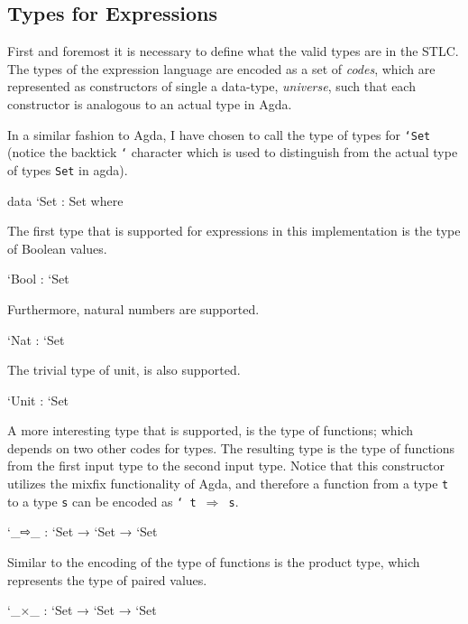 \documentclass{article}
\begin{document}
\subsection{Types for Expressions}
\label{sub:TypesforExpressions}

First and foremost it is necessary to define what the valid types are in the STLC.
The types of the expression language are encoded as a set of \textit{codes}, which are represented as constructors of single a data-type, \textit{universe},
such that each constructor is analogous to an actual type in Agda.

In a similar fashion to Agda, I have chosen to call the type of types for \texttt{`Set} (notice the backtick \texttt{`} character which is used to distinguish from
the actual type of types \texttt{Set} in agda).
\begin{code}
  data `Set : Set where
\end{code}

The first type that is supported for expressions in this implementation is the type of Boolean values.
\begin{code}
    `Bool : `Set
\end{code}

Furthermore, natural numbers are supported.
\begin{code}
    `Nat  : `Set
\end{code}

The trivial type of unit, is also supported.

\begin{code}
    `Unit : `Set
\end{code}

A more interesting type that is supported, is the type of functions; which depends on two other codes for types. The resulting type is the type of functions
from the first input type to the second input type. Notice that this constructor utilizes the mixfix functionality of Agda, and therefore
a function from a type \texttt{t} to a type \texttt{s} can be encoded as \texttt{` t $\Longrightarrow$ s}.

\begin{code}
    `_⇨_  : `Set → `Set → `Set
\end{code}

Similar to the encoding of the type of functions is the product type, which represents the type of paired values.

\begin{code}
    `_×_  : `Set → `Set → `Set
\end{code}
\end{document}
